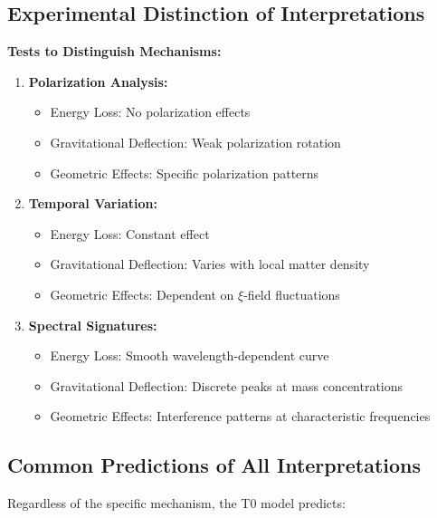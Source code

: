 	\subsection{Experimental Distinction of Interpretations}
	
	\begin{experiment}
		\textbf{Tests to Distinguish Mechanisms:}
		
		\begin{enumerate}
			\item \textbf{Polarization Analysis:}
			\begin{itemize}
				\item Energy Loss: No polarization effects
				\item Gravitational Deflection: Weak polarization rotation
				\item Geometric Effects: Specific polarization patterns
			\end{itemize}
			
			\item \textbf{Temporal Variation:}
			\begin{itemize}
				\item Energy Loss: Constant effect
				\item Gravitational Deflection: Varies with local matter density
				\item Geometric Effects: Dependent on $\xi$-field fluctuations
			\end{itemize}
			
			\item \textbf{Spectral Signatures:}
			\begin{itemize}
				\item Energy Loss: Smooth wavelength-dependent curve
				\item Gravitational Deflection: Discrete peaks at mass concentrations
				\item Geometric Effects: Interference patterns at characteristic frequencies
			\end{itemize}
		\end{enumerate}
	\end{experiment}
	
	\subsection{Common Predictions of All Interpretations}
	
	Regardless of the specific mechanism, the T0 model predicts:
	
